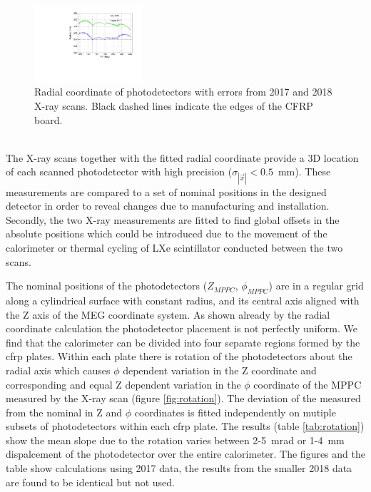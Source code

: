 \begin{figure}[h]
\includegraphics[width=4cm]{plots/2018/cRadius_1718}
\caption{ Radial coordinate of photodetectors with errors from 2017 and 2018
X-ray scans.  Black dashed lines indicate the edges of the CFRP board.}
\label{fig:radiuscalculation} 
\end{figure}



 \\ 
The X-ray scans together with the fitted radial coordinate
provide a 3D location of each scanned photodetector  with high
precision ($\sigma_{|\vec{x}|}<0.5$~mm).  These measurements are
compared to a set of nominal positions in the designed detector
in order to reveal changes due to manufacturing and installation.
Secondly, the two X-ray  measurements are fitted to find global
offsets in the absolute positions which could be introduced due
to the movement of the calorimeter or thermal cycling of LXe
scintillator conducted between the two scans.

The nominal positions of the photodetectors
($Z_{MPPC}$, $\phi_{MPPC}$) are in a regular grid along
a cylindrical surface with constant radius, and its central
axis aligned with the Z axis of the MEG coordinate system.  
As shown already by the radial coordinate calculation
the photodetector placement is not perfectly uniform.
We find that the calorimeter can be divided into four separate
regions formed by the cfrp plates. Within each plate
there is rotation of the photodetectors about the radial
axis which causes $\phi$ dependent variation in the 
Z coordinate and corresponding and equal 
Z dependent variation in the $\phi$ coordinate
of the MPPC measured by the X-ray scan 
(figure \ref{fig:rotation}). The deviation of 
the measured from the 
nominal in Z and $\phi$ coordinates is fitted 
independently on mutiple subsets of photodetectors 
within each cfrp plate. The results (table \ref{tab:rotation})
show the mean slope due to the rotation varies between
2-5~mrad  or 1-4~mm dispalcement of the photodetector
over the entire calorimeter. The figures and the table 
show calculations using 2017 data, the results from 
the smaller 2018 data are found to be identical but not used.
\\
\\
\\

